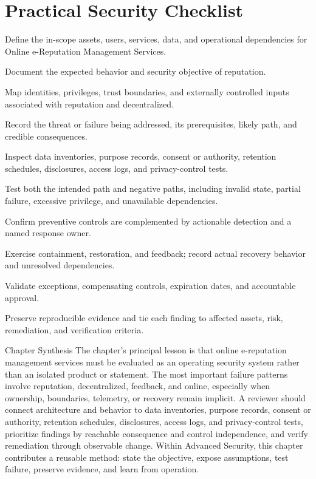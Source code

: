 \documentclass[11pt,letterpaper]{article}
\begin{document}
\section*{Practical Security Checklist}
\begin{CornellChecklist}
\item Define the in-scope assets, users, services, data, and operational dependencies for Online e-Reputation Management Services.
\item Document the expected behavior and security objective of reputation.
\item Map identities, privileges, trust boundaries, and externally controlled inputs associated with reputation and decentralized.
\item Record the threat or failure being addressed, its prerequisites, likely path, and credible consequences.
\item Inspect data inventories, purpose records, consent or authority, retention schedules, disclosures, access logs, and privacy-control tests.
\item Test both the intended path and negative paths, including invalid state, partial failure, excessive privilege, and unavailable dependencies.
\item Confirm preventive controls are complemented by actionable detection and a named response owner.
\item Exercise containment, restoration, and feedback; record actual recovery behavior and unresolved dependencies.
\item Validate exceptions, compensating controls, expiration dates, and accountable approval.
\item Preserve reproducible evidence and tie each finding to affected assets, risk, remediation, and verification criteria.
\end{CornellChecklist}
\begin{CornellSummaryBox}{Chapter Synthesis}
The chapter's principal lesson is that online e-reputation management services must be evaluated as an operating security system rather than an isolated product or statement. The most important failure patterns involve reputation, decentralized, feedback, and online, especially when ownership, boundaries, telemetry, or recovery remain implicit. A reviewer should connect architecture and behavior to data inventories, purpose records, consent or authority, retention schedules, disclosures, access logs, and privacy-control tests, prioritize findings by reachable consequence and control independence, and verify remediation through observable change. Within Advanced Security, this chapter contributes a reusable method: state the objective, expose assumptions, test failure, preserve evidence, and learn from operation.
\end{CornellSummaryBox}
\end{document}
